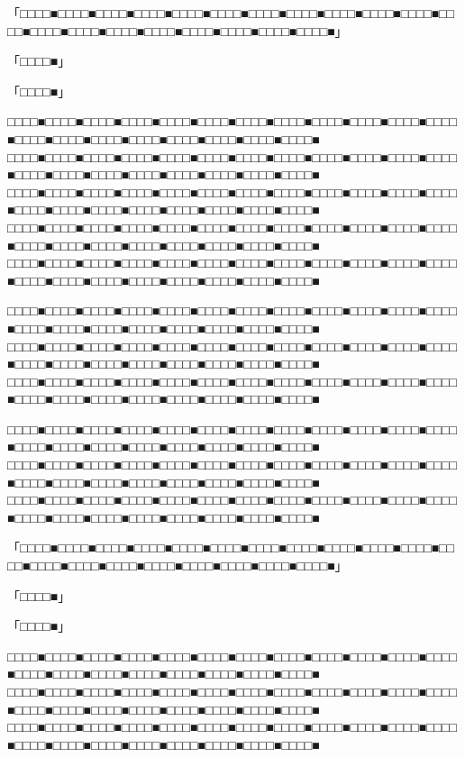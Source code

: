 \documentclass[
tate,
book,
openany,
paper={202mm,270mm},
oneside,
fontsize=9pt, %
jafontsize=9pt, %
head_space=11truemm, %
gutter=8truemm, %
line_length=78zw, %
number_of_lines=35, %
column_gap=5truemm,%
headfoot_verticalposition=4truemm,%
draft
]{jlreq}
\begin{document}
\begin{multicols*}{3}
「□□□□■□□□□■□□□□■□□□□■□□□□■□□□□■□□□□■□□□□■□□□□■□□□□■□□□□■□□□□■□□□□■□□□□■□□□□■□□□□■□□□□■□□□□■□□□□■□□□□■」

「□□□□■」

「□□□□■」

□□□□■□□□□■□□□□■□□□□■□□□□■□□□□■□□□□■□□□□■□□□□■□□□□■□□□□■□□□□■□□□□■□□□□■□□□□■□□□□■□□□□■□□□□■□□□□■□□□□■
□□□□■□□□□■□□□□■□□□□■□□□□■□□□□■□□□□■□□□□■□□□□■□□□□■□□□□■□□□□■□□□□■□□□□■□□□□■□□□□■□□□□■□□□□■□□□□■□□□□■
□□□□■□□□□■□□□□■□□□□■□□□□■□□□□■□□□□■□□□□■□□□□■□□□□■□□□□■□□□□■□□□□■□□□□■□□□□■□□□□■□□□□■□□□□■□□□□■□□□□■
□□□□■□□□□■□□□□■□□□□■□□□□■□□□□■□□□□■□□□□■□□□□■□□□□■□□□□■□□□□■□□□□■□□□□■□□□□■□□□□■□□□□■□□□□■□□□□■□□□□■
□□□□■□□□□■□□□□■□□□□■□□□□■□□□□■□□□□■□□□□■□□□□■□□□□■□□□□■□□□□■□□□□■□□□□■□□□□■□□□□■□□□□■□□□□■□□□□■□□□□■

□□□□■□□□□■□□□□■□□□□■□□□□■□□□□■□□□□■□□□□■□□□□■□□□□■□□□□■□□□□■□□□□■□□□□■□□□□■□□□□■□□□□■□□□□■□□□□■□□□□■
□□□□■□□□□■□□□□■□□□□■□□□□■□□□□■□□□□■□□□□■□□□□■□□□□■□□□□■□□□□■□□□□■□□□□■□□□□■□□□□■□□□□■□□□□■□□□□■□□□□■
□□□□■□□□□■□□□□■□□□□■□□□□■□□□□■□□□□■□□□□■□□□□■□□□□■□□□□■□□□□■□□□□■□□□□■□□□□■□□□□■□□□□■□□□□■□□□□■□□□□■

□□□□■□□□□■□□□□■□□□□■□□□□■□□□□■□□□□■□□□□■□□□□■□□□□■□□□□■□□□□■□□□□■□□□□■□□□□■□□□□■□□□□■□□□□■□□□□■□□□□■
□□□□■□□□□■□□□□■□□□□■□□□□■□□□□■□□□□■□□□□■□□□□■□□□□■□□□□■□□□□■□□□□■□□□□■□□□□■□□□□■□□□□■□□□□■□□□□■□□□□■
□□□□■□□□□■□□□□■□□□□■□□□□■□□□□■□□□□■□□□□■□□□□■□□□□■□□□□■□□□□■□□□□■□□□□■□□□□■□□□□■□□□□■□□□□■□□□□■□□□□■

「□□□□■□□□□■□□□□■□□□□■□□□□■□□□□■□□□□■□□□□■□□□□■□□□□■□□□□■□□□□■□□□□■□□□□■□□□□■□□□□■□□□□■□□□□■□□□□■□□□□■」

「□□□□■」

「□□□□■」

□□□□■□□□□■□□□□■□□□□■□□□□■□□□□■□□□□■□□□□■□□□□■□□□□■□□□□■□□□□■□□□□■□□□□■□□□□■□□□□■□□□□■□□□□■□□□□■□□□□■
□□□□■□□□□■□□□□■□□□□■□□□□■□□□□■□□□□■□□□□■□□□□■□□□□■□□□□■□□□□■□□□□■□□□□■□□□□■□□□□■□□□□■□□□□■□□□□■□□□□■
□□□□■□□□□■□□□□■□□□□■□□□□■□□□□■□□□□■□□□□■□□□□■□□□□■□□□□■□□□□■□□□□■□□□□■□□□□■□□□□■□□□□■□□□□■□□□□■□□□□■


\end{multicols*}
\end{document}
